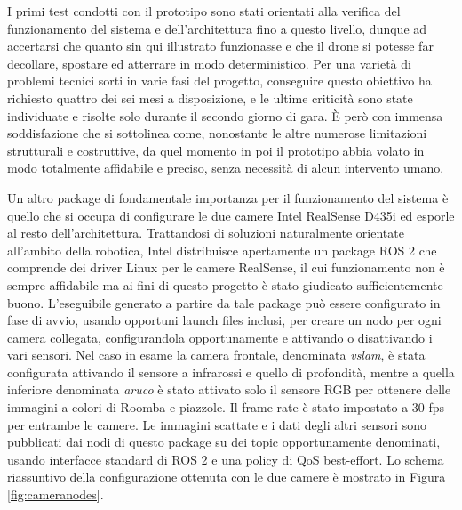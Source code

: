 I primi test condotti con il prototipo sono stati orientati alla verifica del funzionamento del sistema e dell'architettura fino a questo livello, dunque ad accertarsi che quanto sin qui illustrato funzionasse e che il drone si potesse far decollare, spostare ed atterrare in modo deterministico. Per una varietà di problemi tecnici sorti in varie fasi del progetto, conseguire questo obiettivo ha richiesto quattro dei sei mesi a disposizione, e le ultime criticità sono state individuate e risolte solo durante il secondo giorno di gara. È però con immensa soddisfazione che si sottolinea come, nonostante le altre numerose limitazioni strutturali e costruttive, da quel momento in poi il prototipo abbia volato in modo totalmente affidabile e preciso, senza necessità di alcun intervento umano.

\indent Un altro package di fondamentale importanza per il funzionamento del sistema è quello che si occupa di configurare le due camere Intel RealSense D435i ed esporle al resto dell'architettura. Trattandosi di soluzioni naturalmente orientate all'ambito della robotica, Intel distribuisce apertamente un package ROS 2 che comprende dei driver Linux per le camere RealSense, il cui funzionamento non è sempre affidabile ma ai fini di questo progetto è stato giudicato sufficientemente buono. L'eseguibile generato a partire da tale package può essere configurato in fase di avvio, usando opportuni launch files inclusi, per creare un nodo per ogni camera collegata, configurandola opportunamente e attivando o disattivando i vari sensori. Nel caso in esame la camera frontale, denominata \emph{vslam}, è stata configurata attivando il sensore a infrarossi e quello di profondità, mentre a quella inferiore denominata \emph{aruco} è stato attivato solo il sensore RGB per ottenere delle immagini a colori di Roomba e piazzole. Il frame rate è stato impostato a 30 fps per entrambe le camere. Le immagini scattate e i dati degli altri sensori sono pubblicati dai nodi di questo package su dei topic opportunamente denominati, usando interfacce standard di ROS 2 e una policy di QoS best-effort. Lo schema riassuntivo della configurazione ottenuta con le due camere è mostrato in Figura \ref{fig:cameranodes}.

